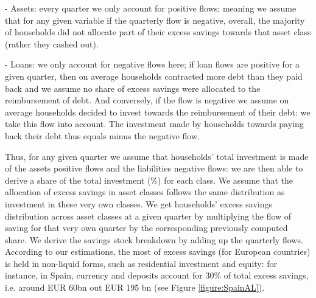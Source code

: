 - Assets: every quarter we only account for positive flows; meaning we assume that for any given variable if the quarterly flow is negative, overall, the majority of households did not allocate part of their excess savings towards that asset class (rather they cashed out).

- Loans: we only account for negative flows here; if loan flows are positive for a given quarter, then on average households contracted more debt than they paid back and we assume no share of excess savings were allocated to the reimbursement of debt. 
And conversely, if the flow is negative we assume on average households decided to invest towards the reimbursement of their debt: we take this flow into account. The investment made by households towards paying back their debt thus equals minus the negative flow. 

Thus, for any given quarter we assume that households' total investment is made of the assets positive flows and the liabilities negative flows: we are then able to derive a share of the total investment (\%) for each class. 
We assume that the allocation of excess savings in asset classes follows the same distribution as investment in these very own classes. 
We get households' excess savings distribution across asset classes at a given quarter by multiplying the flow of saving for that very own quarter by the corresponding previously computed share. 
We derive the savings stock breakdown by adding up the quarterly flows. According to our estimations, the most of excess savings (for European countries) is held in non-liquid forms, such as residential investment and equity: for instance, in Spain, currency and deposits account for 30\% of total excess savings, i.e. around EUR 60bn out EUR 195 bn (see Figure \ref{figure:SpainAL}). 

